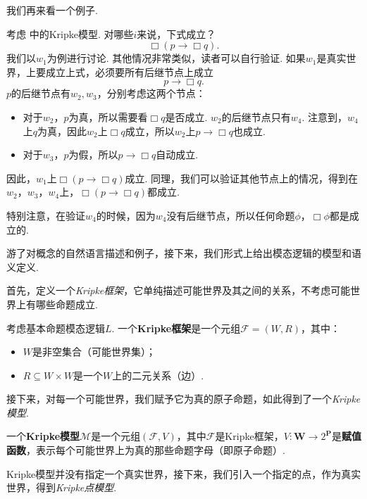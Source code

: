 我们再来看一个例子. 

\begin{example}\label{ex:kripke-model-basic}
考虑 中的Kripke模型. 对哪些$i$来说，下式成立？
\[\Box (p\to\Box q).\]
我们以$w_1$为例进行讨论. 其他情况非常类似，读者可以自行验证. 如果$w_1$是真实世界，上要成立上式，必须要所有后继节点上成立
    \[p\to\Box q.\]
$p$的后继节点有$w_2,w_3$，分别考虑这两个节点：
\begin{itemize}
    \item 对于$w_2$，$p$为真，所以需要看$\Box q$是否成立. $w_2$的后继节点只有$w_4$. 注意到，$w_4$上$q$为真，因此$w_2$上$\Box q$成立，所以$w_2$上$p\to\Box q$也成立. 
    \item 对于$w_3$，$p$为假，所以$p\to\Box q$自动成立. 
\end{itemize}
因此，$w_1$上$\Box (p\to\Box q)$成立. 同理，我们可以验证其他节点上的情况，得到在$w_2$，$w_3$，$w_4$上，$\Box (p\to\Box q)$都成立. 

特别注意，在验证$w_4$的时候，因为$w_4$没有后继节点，所以任何命题$\phi$，$\Box\phi$都是成立的. 
\end{example}

游了对概念的自然语言描述和例子，接下来，我们形式上给出模态逻辑的模型和语义定义. 

首先，定义一个\emph{Kripke框架}，它单纯描述可能世界及其之间的关系，不考虑可能世界上有哪些命题成立. 

\begin{definition}[Kripke框架]
考虑基本命题模态逻辑$L$. 一个\textbf{Kripke框架}是一个元组$\mathcal F=(W,R)$，其中：
\begin{itemize}
\item $W$是非空集合（可能世界集）；
\item $R\subseteq W\times W$是一个$W$上的二元关系（边）. 
\end{itemize}
\end{definition}

接下来，对每一个可能世界，我们赋予它为真的原子命题，如此得到了一个\emph{Kripke模型}. 

\begin{definition}[Kripke模型]
一个\textbf{Kripke模型}$\mathcal{M}$是一个元组$(\mathcal F,V)$，其中$\mathcal F$是Kripke框架，$V:\mathbf W\to 2^{\mathbf P}$是\textbf{赋值函数}，表示每个可能世界上为真的那些命题字母（即原子命题）. 
\end{definition}

Kripke模型并没有指定一个真实世界，接下来，我们引入一个指定的点，作为真实世界，得到\emph{Kripke点模型}. 

